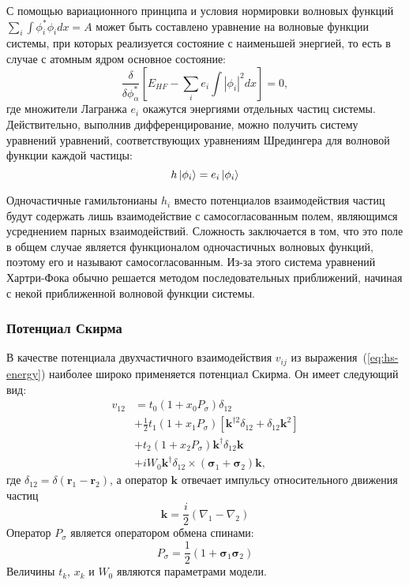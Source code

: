 С помощью вариационного принципа и условия нормировки волновых функций $\sum_i \int \phi_i^* \phi_i dx = A$ может быть составлено уравнение на волновые функции системы, при которых реализуется состояние с наименьшей энергией, то есть в случае с атомным ядром основное состояние:
\begin{equation}
\displaystyle
\frac{\delta}{\delta \phi^*_\alpha}
\left[ E_{HF} - \sum_i e_i \int |\phi_i|^2 dx \right] = 0,
\end{equation}
где множители Лагранжа $e_i$ окажутся энергиями отдельных частиц системы. Действительно, выполнив дифференцирование, можно получить систему уравнений уравнений, соответствующих уравнениям Шредингера для волновой функции каждой частицы:
\begin{equation}
h \ket{\phi_i} = e_i \ket{\phi_i}
\end{equation}

Одночастичные гамильтонианы $h_i$ вместо потенциалов взаимодействия частиц будут содержать лишь взаимодействие с самосогласованным полем, являющимся усреднением парных взаимодействий. Сложность заключается в том, что это поле в общем случае является функционалом одночастичных волновых функций, поэтому его и называют самосогласованным. Из-за этого система уравнений Хартри-Фока обычно решается методом последовательных приближений, начиная с некой приближенной волновой функции системы.

\subsubsection{Потенциал Скирма}
В качестве потенциала двухчастичного взаимодействия $v_{ij}$ из выражения~(\ref{eq:hs-energy}) наиболее широко применяется потенциал Скирма. Он имеет следующий вид:
\begin{equation}
\begin{aligned}
\displaystyle
v_{12} &= t_0 (1 + x_0 P_\sigma) \delta_{12} \\
       &+ \frac{1}{2} t_1 (1 + x_1 P_\sigma) 
       \left[\bm{k}^{\dag 2} \delta_{12} + \delta_{12} \bm{k}^2\right] \\
       &+ t_2 (1 + x_2 P_\sigma) \bm{k}^\dag \delta_{12} \bm{k} \\
       &+ i W_0 \bm{k}^\dag \delta_{12} \times 
       (\bm{\sigma}_1 + \bm{\sigma}_2) \bm{k},
\label{eq:skyrme-2}
\end{aligned}
\end{equation}
где $\delta_{12} = \delta(\bm{r}_1 - \bm{r}_2)$, а оператор $\bm{k}$ отвечает импульсу относительного движения частиц
\begin{equation}
\displaystyle
\bm{k} = \frac{i}{2} (\nabla_1 - \nabla_2)
\end{equation}
Оператор $P_\sigma$ является оператором обмена спинами:
\begin{equation}
\displaystyle
P_\sigma = \frac{1}{2} (1 + \bm{\sigma}_1 \bm{\sigma}_2)
\end{equation}
Величины $t_k$, $x_k$ и $W_0$ являются параметрами модели.

